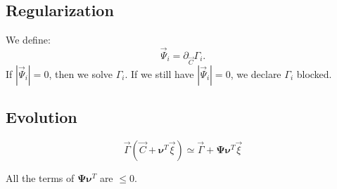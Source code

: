 \documentclass[aps,12pt]{revtex4}
\begin{document}
 	
\subsection{Regularization}
We define:
\begin{equation}
\vec{\Psi}_i = \partial_{\vec{C}} \Gamma_i.
\end{equation}
If $|\vec{\Psi}_i|=0$, then we solve $\Gamma_i$. If we still have $|\vec{\Psi}_i|=0$, we declare $\Gamma_i$ blocked.

\subsection{Evolution}

\begin{equation}
	\vec{\Gamma}(\vec{C}+\bm{\nu}^T \vec{\xi}) \simeq \vec{\Gamma} + \bm{\Psi} \bm{\nu}^T \vec{\xi}
\end{equation}	

All the terms of $	\bm{\Psi} \bm{\nu}^T $ are $\leq 0$.




 


 
\end{document}
